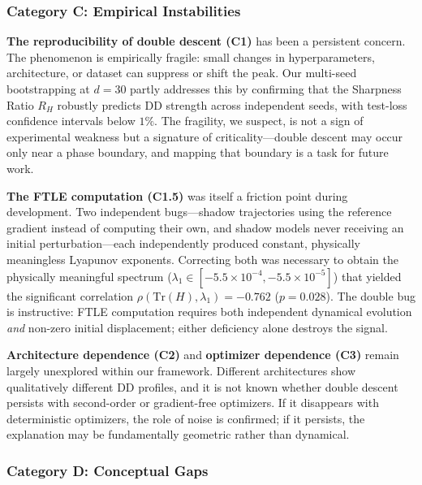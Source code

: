 \documentclass[
  journal=largetwo,
  simfonts=false,
  year=2025,
  volume=37,
]{cup-journal}
\begin{document}
\subsubsection{Category C: Empirical Instabilities}

\textbf{The reproducibility of double descent (C1)} has been a persistent concern. The phenomenon is empirically fragile: small changes in hyperparameters, architecture, or dataset can suppress or shift the peak. Our multi-seed bootstrapping at $d=30$ partly addresses this by confirming that the Sharpness Ratio $R_H$ robustly predicts DD strength across independent seeds, with test-loss confidence intervals below $1\%$. The fragility, we suspect, is not a sign of experimental weakness but a signature of criticality---double descent may occur only near a phase boundary, and mapping that boundary is a task for future work.

\textbf{The FTLE computation (C1.5)} was itself a friction point during development. Two independent bugs---shadow trajectories using the reference gradient instead of computing their own, and shadow models never receiving an initial perturbation---each independently produced constant, physically meaningless Lyapunov exponents. Correcting both was necessary to obtain the physically meaningful spectrum ($\lambda_1 \in [-5.5 \times 10^{-4}, -5.5 \times 10^{-5}]$) that yielded the significant correlation $\rho(\mathrm{Tr}(H), \lambda_1) = -0.762$ ($p=0.028$). The double bug is instructive: FTLE computation requires both independent dynamical evolution \emph{and} non-zero initial displacement; either deficiency alone destroys the signal.

\textbf{Architecture dependence (C2)} and \textbf{optimizer dependence (C3)} remain largely unexplored within our framework. Different architectures show qualitatively different DD profiles, and it is not known whether double descent persists with second-order or gradient-free optimizers. If it disappears with deterministic optimizers, the role of noise is confirmed; if it persists, the explanation may be fundamentally geometric rather than dynamical.

\subsubsection{Category D: Conceptual Gaps}
\end{document}
